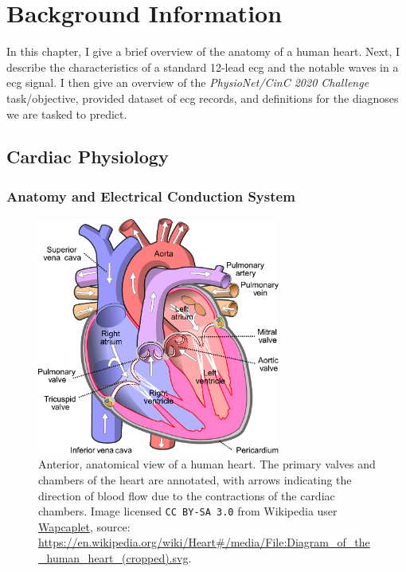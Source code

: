 \documentclass[\main/thesis.tex]{subfiles}
\begin{document}
\chapter{Background Information}
\label{chp:background}

In this chapter, I give a brief overview of the anatomy of a human heart.
Next, I describe the characteristics of a standard 12-lead \gls{ecg} and the notable waves in a \gls{ecg} signal.
I then give an overview of the \emph{PhysioNet/CinC 2020 Challenge} task/objective, provided dataset of \gls{ecg} records, and definitions for the diagnoses we are tasked to predict.

\section{Cardiac Physiology}

\subsection{Anatomy and Electrical Conduction System}
\begin{figure}[ht]
    \centering
    \includegraphics[width=8cm]{figure/Diagram_of_the_human_heart.pdf}
    \caption[Anterior, anatomical view of the structures of a human heart.]{Anterior, anatomical view of a human heart. The primary valves and chambers of the heart are annotated, with arrows indicating the direction of blood flow due to the contractions of the cardiac chambers.
    Image licensed \texttt{CC BY-SA 3.0} from Wikipedia user \href{https://en.wikipedia.org/wiki/User:Wapcaplet}{Wapcaplet}, source: \url{https://en.wikipedia.org/wiki/Heart\#/media/File:Diagram\_of\_the\_human\_heart\_(cropped).svg}.
    }
    \label{fig:heart_anatomy}
\end{figure}
\end{document}
